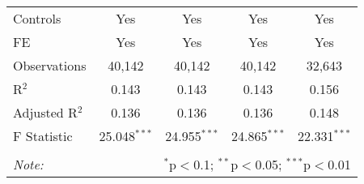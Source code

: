 \begin{table}[!htbp]
\begin{tabular}{@{\extracolsep{5pt}}lcccc}
Controls & Yes & Yes & Yes & Yes \\ 
FE & Yes & Yes & Yes & Yes \\ 
Observations & 40,142 & 40,142 & 40,142 & 32,643 \\ 
R$^{2}$ & 0.143 & 0.143 & 0.143 & 0.156 \\ 
Adjusted R$^{2}$ & 0.136 & 0.136 & 0.136 & 0.148 \\ 
F Statistic & 25.048$^{***}$ & 24.955$^{***}$ & 24.865$^{***}$ & 22.331$^{***}$ \\ 
\hline 
\hline \\[-1.8ex] 
\textit{Note:}  & \multicolumn{4}{r}{$^{*}$p$<$0.1; $^{**}$p$<$0.05; $^{***}$p$<$0.01} \\ 
\end{tabular} 
\end{table} 
